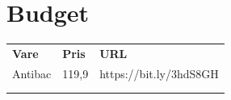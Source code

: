 \documentclass{article}
\begin{document}
\section{Budget}
\begin{table}[H]
\begin{tabular}{lll}
\textbf{Vare} & \textbf{Pris} & \textbf{URL}      \\
Antibac       & 119,9         & https://bit.ly/3hdS8GH \\
              &               &                   \\
              &               &                  
\end{tabular}
\end{table}
\end{document}
